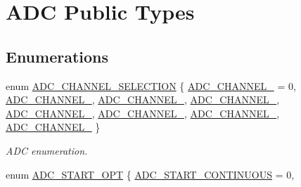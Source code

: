 \hypertarget{group___a_d_c___public___types}{\section{\-A\-D\-C \-Public \-Types}
\label{group___a_d_c___public___types}
}
\subsection*{\-Enumerations}
\begin{DoxyCompactItemize}
\item 
enum \hyperlink{group___a_d_c___public___types_ga89aa5114c80540103cfb71c4420b914b}{\-A\-D\-C\-\_\-\-C\-H\-A\-N\-N\-E\-L\-\_\-\-S\-E\-L\-E\-C\-T\-I\-O\-N} \{ \*
\hyperlink{group___a_d_c___public___types_gga89aa5114c80540103cfb71c4420b914ba69dddf5b6edfe54ac25b653d8f62d104}{\-A\-D\-C\-\_\-\-C\-H\-A\-N\-N\-E\-L\-\_} =  0, 
\hyperlink{group___a_d_c___public___types_gga89aa5114c80540103cfb71c4420b914ba203b48944d019f4fda969a6fc2a9e492}{\-A\-D\-C\-\_\-\-C\-H\-A\-N\-N\-E\-L\-\_}, 
\hyperlink{group___a_d_c___public___types_gga89aa5114c80540103cfb71c4420b914bab5ff3c915ec02ae6ac3980a1312a4815}{\-A\-D\-C\-\_\-\-C\-H\-A\-N\-N\-E\-L\-\_}, 
\hyperlink{group___a_d_c___public___types_gga89aa5114c80540103cfb71c4420b914ba6ca054f67bee5197eec92a0379cffb6e}{\-A\-D\-C\-\_\-\-C\-H\-A\-N\-N\-E\-L\-\_}, 
\*
\hyperlink{group___a_d_c___public___types_gga89aa5114c80540103cfb71c4420b914ba358c6f5e7243a7ed09640253d83d2131}{\-A\-D\-C\-\_\-\-C\-H\-A\-N\-N\-E\-L\-\_}, 
\hyperlink{group___a_d_c___public___types_gga89aa5114c80540103cfb71c4420b914badd27743e52a0719102130818d31d545a}{\-A\-D\-C\-\_\-\-C\-H\-A\-N\-N\-E\-L\-\_}, 
\hyperlink{group___a_d_c___public___types_gga89aa5114c80540103cfb71c4420b914bacf3be71bfeb9d342e6d845db91782b79}{\-A\-D\-C\-\_\-\-C\-H\-A\-N\-N\-E\-L\-\_}, 
\hyperlink{group___a_d_c___public___types_gga89aa5114c80540103cfb71c4420b914bad6ef86ca1b448f220905d771f258586a}{\-A\-D\-C\-\_\-\-C\-H\-A\-N\-N\-E\-L\-\_}
 \}
\begin{DoxyCompactList}\small\item\em \-A\-D\-C enumeration. \end{DoxyCompactList}\item 
enum \hyperlink{group___a_d_c___public___types_gac6226b9af610bd4800b65ddfc93ee516}{\-A\-D\-C\-\_\-\-S\-T\-A\-R\-T\-\_\-\-O\-P\-T} \{ \*
\hyperlink{group___a_d_c___public___types_ggac6226b9af610bd4800b65ddfc93ee516a5c995804004511aebc0e20fe090e24e7}{\-A\-D\-C\-\_\-\-S\-T\-A\-R\-T\-\_\-\-C\-O\-N\-T\-I\-N\-U\-O\-U\-S} = 0, 

\end{DoxyCompactItemize}
